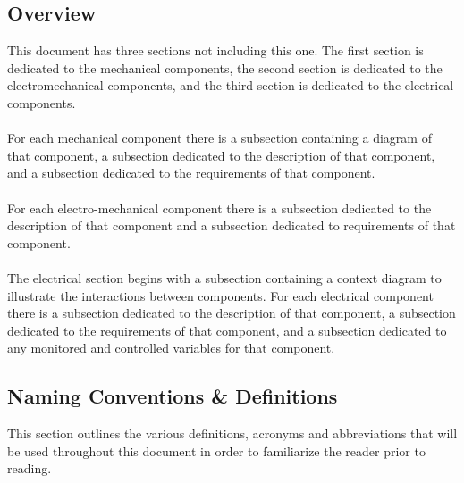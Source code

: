 \documentclass[titlepage]{article}
\begin{document}
\subsection{Overview}
This document has three sections not including this one. The first section is dedicated to the mechanical components, the second section is dedicated to the electromechanical components, and the third section is dedicated to the electrical components.\\\\
For each mechanical component there is a subsection containing a diagram of that component, a subsection dedicated to the description of that component, and a subsection dedicated to the requirements of that component.\\\\
For each electro-mechanical component there is a subsection dedicated to the description of that component and a subsection dedicated to requirements of that component.\\\\
The electrical section begins with a subsection containing a context diagram to illustrate the interactions between components. For each electrical component there is a subsection dedicated to the description of that component, a subsection dedicated to the requirements of that component, and a subsection dedicated to any monitored and controlled variables for that component.

\subsection{Naming Conventions \& Definitions}
This section outlines the various definitions, acronyms and abbreviations that will be used throughout this document in order to familiarize the reader prior to reading.
\newpage
\end{document}
